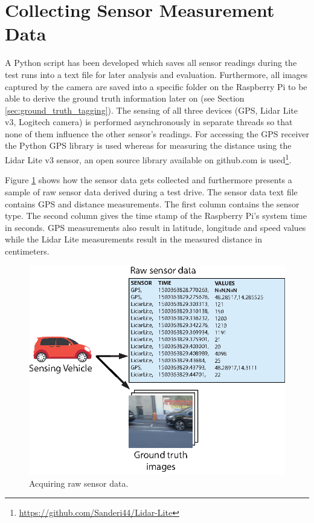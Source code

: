 \section{Collecting Sensor Measurement Data}
\label{sec:sensor_measurement_collection}

A Python script has been developed which saves all sensor readings during the test runs into a text file for later analysis and evaluation. Furthermore, all images captured by the camera are saved into a specific folder on the Raspberry Pi to be able to derive the ground truth information later on (see Section \ref{sec:ground_truth_tagging}).
The sensing of all three devices (GPS, Lidar Lite v3, Logitech camera) is performed asynchronously in separate threads so that none of them influence the other sensor's readings. For accessing the GPS receiver the Python GPS library is used whereas for measuring the distance using the Lidar Lite v3 sensor, an open source library available on github.com is used\footnote{\url{https://github.com/Sanderi44/Lidar-Lite}}. 

Figure \ref{fig:sample_sensor_trace} shows how the sensor data gets collected and furthermore presents a sample of raw sensor data derived during a test drive. The sensor data text file contains GPS and distance measurements. The first column contains the sensor type. The second column gives the time stamp of the Raspberry Pi's system time in seconds. GPS measurements also result in latitude, longitude and speed values while the Lidar Lite measurements result in the measured distance in centimeters.


\begin{figure}
	\centering
	\includegraphics{img/obtaining-raw-dataset.eps}
	\caption{Acquiring raw sensor data.}
	\label{fig:sample_sensor_trace}
\end{figure}



